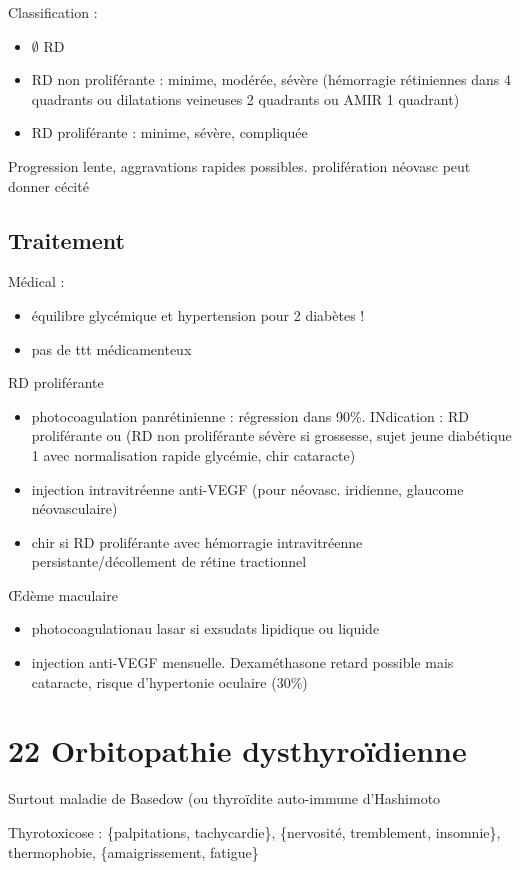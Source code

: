 \documentclass[11pt]{article}
\begin{document}
Classification :
\begin{itemize}
\item \(\emptyset\) RD
\item RD non proliférante : minime, modérée, sévère (hémorragie rétiniennes dans 4
quadrants ou dilatations veineuses 2 quadrants ou AMIR 1 quadrant)
\item RD proliférante : minime, sévère, compliquée
\end{itemize}

Progression lente, aggravations rapides possibles. \danger prolifération néovasc
peut donner cécité 

\subsection{Traitement}
\label{sec:orgac56bad}
Médical :
\begin{itemize}
\item équilibre glycémique et hypertension pour 2 diabètes !
\item pas de ttt médicamenteux
\end{itemize}
RD proliférante 
\begin{itemize}
\item photocoagulation panrétinienne : régression dans 90\%. INdication : RD
proliférante ou (RD non proliférante sévère si grossesse, sujet jeune
diabétique 1 avec normalisation rapide glycémie, chir cataracte)
\item injection intravitréenne anti-VEGF (pour néovasc. iridienne, glaucome
néovasculaire)
\item chir si RD proliférante avec hémorragie intravitréenne persistante/décollement
de rétine tractionnel
\end{itemize}
\OE{}dème maculaire 
\begin{itemize}
\item photocoagulationau lasar si exsudats lipidique ou liquide
\item injection anti-VEGF mensuelle. Dexaméthasone retard possible mais cataracte,
risque d'hypertonie oculaire (30\%)
\end{itemize}
\section{22 Orbitopathie dysthyroïdienne}
\label{sec:orga9f8f19}
Surtout maladie de Basedow (ou thyroïdite auto-immune d'Hashimoto

Thyrotoxicose : \{palpitations, tachycardie\}, \{nervosité, tremblement, insomnie\},
thermophobie, \{amaigrissement, fatigue\}
\end{document}
